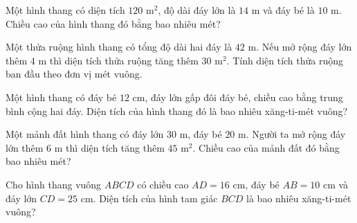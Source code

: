 \begin{ex} %
Một hình thang có diện tích $120\text{ m}^2$, độ dài đáy lớn là $14\text{ m}$ và đáy bé là $10\text{ m}$. Chiều cao của hình thang đó bằng bao nhiêu mét?
\end{ex}

\begin{ex} %
Một thửa ruộng hình thang có tổng độ dài hai đáy là $42\text{ m}$. Nếu mở rộng đáy lớn thêm $4\text{ m}$ thì diện tích thửa ruộng tăng thêm $30\text{ m}^2$. Tính diện tích thửa ruộng ban đầu theo đơn vị mét vuông.
\end{ex}

\begin{ex} %
Một hình thang có đáy bé $12\text{ cm}$, đáy lớn gấp đôi đáy bé, chiều cao bằng trung bình cộng hai đáy. Diện tích của hình thang đó là bao nhiêu xăng-ti-mét vuông?
\end{ex}

\begin{ex} %
Một mảnh đất hình thang có đáy lớn $30\text{ m}$, đáy bé $20\text{ m}$. Người ta mở rộng đáy lớn thêm $6\text{ m}$ thì diện tích tăng thêm $45\text{ m}^2$. Chiều cao của mảnh đất đó bằng bao nhiêu mét?
\end{ex}

\begin{ex} %
Cho hình thang vuông $ABCD$ có chiều cao $AD = 16\text{ cm}$, đáy bé $AB = 10\text{ cm}$ và đáy lớn $CD = 25\text{ cm}$. Diện tích của hình tam giác $BCD$ là bao nhiêu xăng-ti-mét vuông?
\end{ex}
